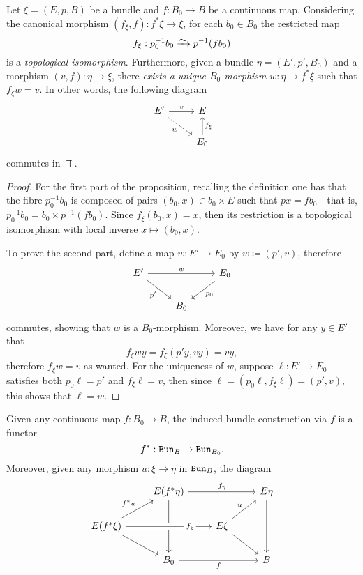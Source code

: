 \documentclass[../../../deep-dive]{subfile}
\begin{document}
\begin{proposition}
\label{prop:induced-bundle-associated-isomorphisms}
Let \(\xi = (E, p, B)\) be a bundle and \(f: B_0 \to B\) be a continuous
map. Considering the canonical morphism \((f_{\xi}, f): f^{*} \xi \to \xi\),
for each \(b_0 \in B_0\) the restricted map
\[
f_{\xi}: p_0^{-1} b_0 \isoto p^{-1}(f b_0)
\]
is a \emph{topological isomorphism}. Furthermore, given a bundle
\(\eta = (E', p', B_0)\) and a morphism \((v, f): \eta \to \xi\), there
\emph{exists a unique \(B_0\)-morphism} \(w: \eta \to f^{*} \xi\) such that
\(f_{\xi} w = v\). In other words, the following diagram
\[
\begin{tikzcd}
E' \ar[r, "v"] \ar[rd, dashed, "w"'] &E \\
&E_0 \ar[u, "f_{\xi}"']
\end{tikzcd}
\]
commutes in \(\Top\).
\end{proposition}

\begin{proof}
For the first part of the proposition, recalling the definition one has that the
fibre \(p_0^{-1} b_0\) is composed of pairs \((b_0, x) \in b_0 \times E\) such
that \(p x = f b_0\)---that is, \(p_0^{-1} b_0 = b_0 \times p^{-1} (f
b_0)\). Since \(f_{\xi}(b_0, x) = x\), then its restriction is a topological
isomorphism with local inverse \(x \mapsto (b_0, x)\).

To prove the second part, define a map \(w: E' \to E_0\) by
\(w \coloneq (p', v)\), therefore
\[
\begin{tikzcd}
E' \ar[rr, "w"] \ar[rd, "p'"'] & &E_0 \ar[dl, "p_0"]  \\
&B_0 &
\end{tikzcd}
\]
commutes, showing that \(w\) is a \(B_0\)-morphism. Moreover, we have for any
\(y \in E'\) that
\[
f_{\xi} w y = f_{\xi}(p' y, v y) = v y,
\]
therefore \(f_{\xi} w = v\) as wanted. For the uniqueness of \(w\), suppose
\(\ell: E' \to E_0\) satisfies both \(p_0 \ell = p'\) and \(f_{\xi} \ell = v\),
then since \(\ell = (p_0 \ell, f_{\xi} \ell) = (p', v)\), this shows that
\(\ell = w\).
\end{proof}

\begin{proposition}
\label{prop:induced-bundle-is-functorial}
Given any continuous map \(f: B_0 \to B\), the induced bundle construction via
\(f\) is a functor
\[
f^{*}: {\texttt{Bun}}_B \to {\texttt{Bun}}_{B_0}.
\]
Moreover, given any morphism \(u: \xi \to \eta\) in \({\texttt{Bun}}_B\), the diagram
\[
\begin{tikzcd}
&E(f^{*} \eta)
\ar[dd]
\ar[rr, "f_{\eta}"]
&
& E \eta \ar[dd]
\\
E (f^{*} \xi)
\ar[ur, "f^{*} u"]
\ar[rd]
\ar[rr, "f_{\xi}" description, crossing over, near end]
&
&E \xi \ar[ur, "u"] \ar[rd]
&
\\
&B_0 \ar[rr, "f"']
&
&B
\end{tikzcd}
\]
\end{proposition}
\end{document}
